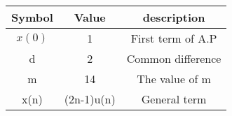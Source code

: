\begin{table}[h!]
\begin{center}
\renewcommand\thetable{1}
\begin{tabular}{ |c|c|c| } 
  \hline
    Symbol & Value & description \\ 
  \hline
  $x(0)$ & 1 & First term of A.P  \\ 
  \hline
  d & 2 & Common difference \\ 
  \hline
  m & 14 & The value of m \\
  \hline
  x(n) & (2n-1)u(n) & General term \\
  \hline
\end{tabular}
\end{center}
\caption{}
\end{table}
